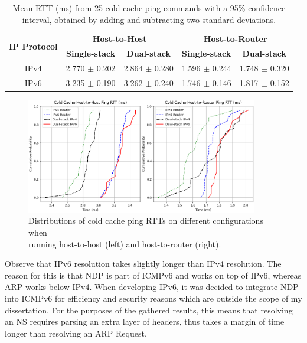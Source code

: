 \begin{table}[htbp]
    \centering
    \renewcommand{\arraystretch}{1.25}
    \begin{tabular}{|c|c|c|c|c|}
    \hline
    \multirow{2}{*}{\textbf{IP Protocol}} & \multicolumn{2}{c|}{\textbf{Host-to-Host}} & \multicolumn{2}{c|}{\textbf{Host-to-Router}}\\
    \cline{2-5}
     & \textbf{Single-stack} & \textbf{Dual-stack} & \textbf{Single-stack} & \textbf{Dual-stack}\\
    \hline
    IPv4 & 2.770 $\pm$ 0.202 & 2.864 $\pm$ 0.280 & 1.596 $\pm$ 0.244 & 1.748 $\pm$ 0.320 \\
    IPv6 & 3.235 $\pm$ 0.190 & 3.262 $\pm$ 0.240 & 1.746 $\pm$ 0.146 & 1.817 $\pm$ 0.152 \\
    \hline
    \end{tabular}
    \caption{Mean RTT (ms) from 25 cold cache ping commands with a 95\% confidence interval, obtained by adding and subtracting two standard deviations.}
    \label{table:eval-pingCC}
\end{table}

\begin{figure}[htbp]
  \centering
    \includegraphics[width=0.90\textwidth]{figures/evaluation/Ping_CC.png}
     \caption{Distributions of cold cache ping RTTs on different configurations when \\ running host-to-host (left) and host-to-router (right).}
     \label{fig:eval-pingCC}
\end{figure}

Observe that IPv6 resolution takes slightly longer than IPv4 resolution. The reason for this is that NDP is part of ICMPv6 and works on top of IPv6, whereas ARP works below IPv4. When developing IPv6, it was decided to integrate NDP into ICMPv6 for efficiency and security reasons which are outside the scope of my dissertation. For the purposes of the gathered results, this means that resolving an NS requires parsing an extra layer of headers, thus takes a margin of time longer than resolving an ARP Request.


